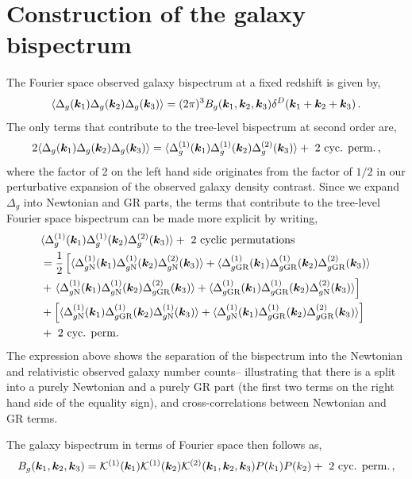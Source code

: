 \section{Construction of the galaxy bispectrum}
The Fourier space observed galaxy bispectrum at a fixed redshift is given by, 
\begin{equation}
	\langle \Delta_g(\bm {k}_1) \Delta_g(\bm {k}_2) \Delta_g(\bm {k}_3) \rangle = (2\pi)^3 B_g(\bm {k}_1,\bm {k}_2,\bm {k}_3) \delta^D(\bm {k}_1+\bm {k}_2+\bm {k}_3)\,.
\end{equation}
The only terms that contribute to the tree-level bispectrum at second order are, 
\begin{equation}
	2 \langle \Delta_g(\bm {k}_1) \Delta_g(\bm {k}_2) \Delta_g(\bm {k}_3) \rangle = \langle \Delta^{(1)}_g(\bm {k}_1) \Delta^{(1)}_g(\bm {k}_2) \Delta^{(2)}_g(\bm {k}_3) \rangle +\text{ 2 cyc. perm.}\,,
\end{equation}
where the factor of 2 on the left hand side originates from the factor of $1/2$ in our perturbative expansion of the observed galaxy density contrast. Since we expand $\Delta_g$ into Newtonian and GR parts, the terms that contribute to the tree-level Fourier space bispectrum can be made more explicit by writing, 
\begin{align}
	&\langle \Delta_g^{(1)}(\bm {k}_1) \Delta_g^{(1)}(\bm {k}_2) \Delta_g^{(2)}(\bm {k}_3) \rangle +\text{ 2 cyclic permutations} \nonumber \\
	&=\frac{1}{2}\left[ \langle \Delta_{g\mathrm{N}}^{(1)}(\bm {k}_1) \Delta_{g\mathrm{N}}^{(1)}(\bm {k}_2) \Delta_{g\mathrm{N}}^{(2)}(\bm {k}_3) \rangle + \langle \Delta_{g\mathrm{GR}}^{(1)}(\bm {k}_1) \Delta_{g\mathrm{GR}}^{(1)}(\bm {k}_2) \Delta_{g\mathrm{GR}}^{(2)}(\bm {k}_3) \rangle \right. \nonumber \\
	& +\left. \langle \Delta_{g\mathrm{N}}^{(1)}(\bm {k}_1) \Delta_{g\mathrm{N}}^{(1)}(\bm {k}_2) \Delta_{g\mathrm{GR}}^{(2)}(\bm {k}_3) \rangle + \langle \Delta_{g\mathrm{GR}}^{(1)}(\bm {k}_1) \Delta_{g\mathrm{GR}}^{(1)}(\bm {k}_2) \Delta_{g\mathrm{N}}^{(2)}(\bm {k}_3) \rangle  \right] \nonumber  \\
	& + \left[ \langle \Delta_{g\mathrm{N}}^{(1)}(\bm {k}_1) \Delta_{g\mathrm{GR}}^{(1)}(\bm {k}_2) \Delta_{g\mathrm{N}}^{(1)}(\bm {k}_3) \rangle + \langle \Delta_{g\mathrm{N}}^{(1)}(\bm {k}_1) \Delta_{g\mathrm{GR}}^{(1)}(\bm {k}_2) \Delta_{g\mathrm{GR}}^{(2)}(\bm {k}_3) \rangle \right] \nonumber \\
	&+ \text{ 2 cyc. perm. }
\end{align}
The expression above shows the separation of the bispectrum into the Newtonian and relativistic observed galaxy number counts-- illustrating that there is a split into a purely Newtonian and a purely GR part (the first two terms on the right hand side of the equality sign), and cross-correlations between Newtonian and GR terms. 

The galaxy bispectrum in terms of Fourier space then follows as, 
\begin{equation}
 	B_g(\bm {k}_1,\bm {k}_2,\bm {k}_3) = \mathcal{K}^{(1)}(\bm {k}_1) \mathcal{K}^{(1)}(\bm {k}_2) \mathcal{K}^{(2)}(\bm {k}_1,\bm {k}_2,\bm {k}_3) P(k_1) P(k_2) + \text{ 2 cyc. perm.}\,,
 \end{equation} 

